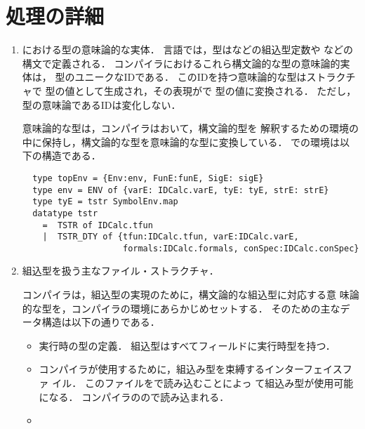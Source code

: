 \section{処理の詳細}
\begin{enumerate}
\item \smlsharp{}における型の意味論的な実体．
	\smlsharp{}言語では，型はなどの組込型定数や
などの構文で定義される．
	\smlsharp{}コンパイラにおけるこれら構文論的な型の意味論的実体は，
型のユニークなIDである．
	このIDを持つ意味論的な型はストラクチャで
型の値として生成され，その表現がで
型の値に変換される．
	ただし，型の意味論であるIDは変化しない．

	意味論的な型は，コンパイラはおいて，構文論的型を
解釈するための環境の中に保持し，構文論的な型を意味論的な型に変換している．
	での環境は以下の構造である．
\begin{verbatim}
  type topEnv = {Env:env, FunE:funE, SigE: sigE}
  type env = ENV of {varE: IDCalc.varE, tyE: tyE, strE: strE}
  type tyE = tstr SymbolEnv.map
  datatype tstr
    =  TSTR of IDCalc.tfun
    |  TSTR_DTY of {tfun:IDCalc.tfun, varE:IDCalc.varE,
                    formals:IDCalc.formals, conSpec:IDCalc.conSpec}
\end{verbatim}


\item 組込型を扱う主なファイル・ストラクチャ．

	コンパイラは，組込型の実現のために，構文論的な組込型に対応する意
味論的な型を，コンパイラの環境にあらかじめセットする．
	そのための主なデータ構造は以下の通りである．

\begin{itemize}
\item {}

	実行時の型の定義．
	組込型はすべてフィールドに実行時型を持つ．

\item {}

	コンパイラが使用するために，組込み型を束縛するインターフェイスファ
イル．
	このファイルをで読み込むことによっ
て組込み型が使用可能になる．
	コンパイラのので読み込まれる．

\item {}


\end{itemize}
\end{enumerate}
